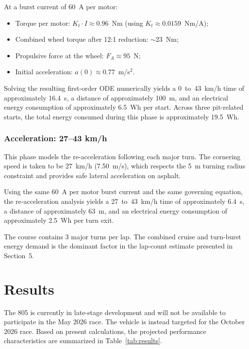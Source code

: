 \documentclass[12pt]{article}
\begin{document}
At a burst current of 60~A per motor:
\begin{itemize}
  \item Torque per motor: $K_t \cdot I \approx 0.96$~Nm
        (using $K_t \approx 0.0159$~Nm/A);
  \item Combined wheel torque after 12:1 reduction: $\sim$23~Nm;
  \item Propulsive force at the wheel: $F_A \approx 95$~N;
  \item Initial acceleration: $a(0) \approx 0.77$~m/s$^2$.
\end{itemize}

Solving the resulting first-order ODE numerically yields a 0~to~43~km/h
time of approximately 16.4~s, a distance of approximately 100~m, and an
electrical energy consumption of approximately 6.5~Wh per start. Across
three pit-related starts, the total energy consumed during this phase is
approximately 19.5~Wh.

\subsubsection{Acceleration: 27--43 km/h}

This phase models the re-acceleration following each major turn. The
cornering speed is taken to be 27~km/h (7.50~m/s), which respects the
5~m turning radius constraint and provides safe lateral acceleration on
asphalt.

Using the same 60~A per motor burst current and the same governing
equation, the re-acceleration analysis yields a 27~to~43~km/h time of
approximately 6.4~s, a distance of approximately 63~m, and an electrical
energy consumption of approximately 2.5~Wh per turn exit.

The course contains 3 major turns per lap. The combined cruise and
turn-burst energy demand is the dominant factor in the lap-count estimate
presented in Section~5.

\section{Results}

The 805 is currently in late-stage development and will not be available to
participate in the May 2026 race. The vehicle is instead targeted for the
October 2026 race. Based on present calculations, the projected performance
characteristics are summarized in Table~\ref{tab:results}.
\end{document}
